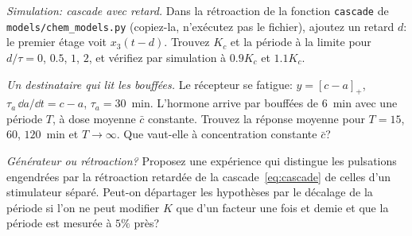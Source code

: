 \begin{exercise}[\lvlB]
\label{ex:16:5}
\emph{Simulation: cascade avec retard.} Dans la rétroaction de la fonction \texttt{cascade} de \texttt{models/\allowbreak chem\_models.py} (copiez-la, n'exécutez pas le fichier), ajoutez un retard $d$: le premier étage voit $x_3(t-d)$. Trouvez $K_c$ et la période à la limite pour $d/\tau=0$, $0.5$, $1$, $2$, et vérifiez par simulation à $0.9K_c$ et $1.1K_c$.
\end{exercise}

\begin{exercise}[\lvlB]
\label{ex:16:6}
\emph{Un destinataire qui lit les bouffées.} Le récepteur se fatigue: $y=[c-a]_+$, $\tau_a\,\dd a/\dd t=c-a$, $\tau_a=30$~min. L'hormone arrive par bouffées de $6$~min avec une période $T$, à dose moyenne $\bar c$ constante. Trouvez la réponse moyenne pour $T=15$, $60$, $120$~min et $T\to\infty$. Que vaut-elle à concentration constante $\bar c$?
\end{exercise}

\begin{exercise}[\lvlC]
\label{ex:16:7}
\emph{Générateur ou rétroaction?} Proposez une expérience qui distingue les pulsations engendrées par la rétroaction retardée de la cascade~\eqref{eq:cascade} de celles d'un stimulateur séparé. Peut-on départager les hypothèses par le décalage de la période si l'on ne peut modifier $K$ que d'un facteur une fois et demie et que la période est mesurée à $5\%$ près?
\end{exercise}
